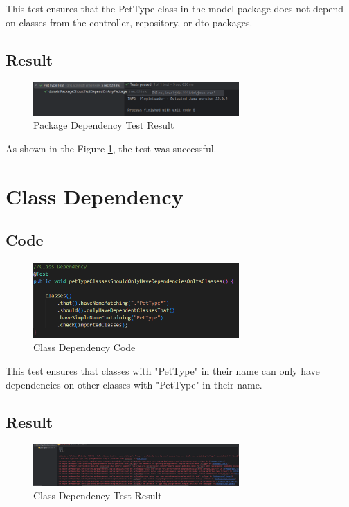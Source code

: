 \documentclass[a4paper,11pt,openright,BCOR=15mm]{scrbook}
\begin{document}
	This test ensures that the PetType class in the model package does not depend on classes from the controller, repository, or dto packages.
	\subsection{Result}
	\begin{figure}[H]
		\centering
		\includegraphics[width=0.7\textwidth]{figs/Architectural Compliance/PackageDependency.png}
		\caption{Package Dependency Test Result}
		\label{fig:Package-Dependency}
	\end{figure}
	As shown in the Figure \ref{fig:Package-Dependency}, the test was successful.
	
	
	
	
	
	\section{Class Dependency}
	\subsection{Code}
	\begin{figure}[H]
		\centering
		\includegraphics[width=0.7\textwidth]{figs/Architectural Compliance/Class Dependency Code.png}
		\caption{Class Dependency Code}
		\label{fig:Class-Dependency-Code}
	\end{figure}
	
This test ensures that classes with "PetType" in their name can only have dependencies on other classes with "PetType" in their name.
	\subsection{Result}
	\begin{figure}[H]
		\centering
		\includegraphics[width=0.7\textwidth]{figs/Architectural Compliance/Class Dependency.png}
		\caption{Class Dependency Test Result}
		\label{fig:Class-Dependency}
	\end{figure}
	
\end{document}
